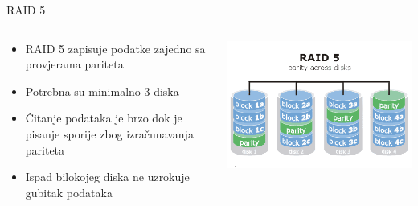 \documentclass[croatian,t]{beamer} %
\begin{document}
    \begin{frame}{RAID 5}
    	\begin{columns}[c]
    		\begin{column}{6cm}
    			\begin{itemize}
    				\item RAID 5 zapisuje podatke zajedno sa provjerama pariteta
   					\item Potrebna su minimalno 3 diska
   					\item Čitanje podataka je brzo dok je pisanje sporije zbog izračunavanja pariteta
   					\item Ispad bilokojeg diska ne uzrokuje gubitak podataka
    			\end{itemize}
    		\end{column}
    		\begin{column}{5cm}
    			\includegraphics[width=1\textwidth]{../pics/raid5.png}
    		\end{column}
    	\end{columns}
    \end{frame}
    
\end{document}

